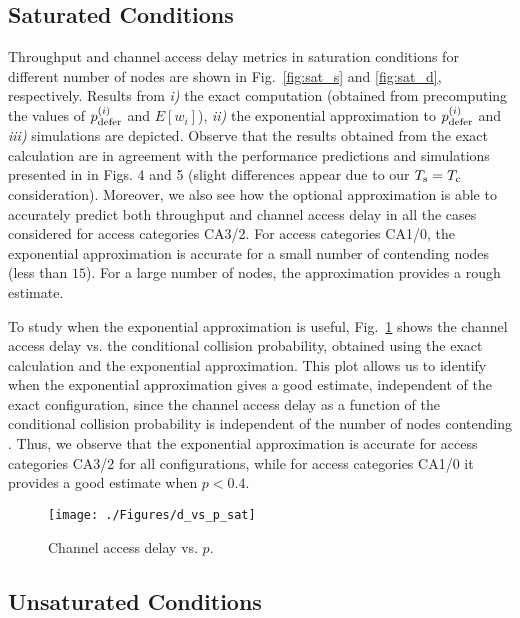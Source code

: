 \documentclass[preprint,12pt]{elsarticle}
\begin{document}
\subsection{Saturated Conditions}

Throughput and channel access delay metrics in saturation conditions for different number of nodes are shown in Fig.~\ref{fig:sat_s} and \ref{fig:sat_d}, respectively. Results from \emph{i)} the exact computation (obtained from precomputing the values of $p_{\rm defer}^{(i)}$ and $E[w_i]$), \emph{ii)} the exponential approximation to $p_{\rm defer}^{(i)}$ and \emph{iii)} simulations are depicted. Observe that the results obtained from the exact calculation are in agreement with the performance predictions and simulations presented in \cite{chung2006performance} in Figs. 4 and 5 (slight differences appear due to our $T_{\rm s} = T_{\rm c}$ consideration). Moreover, we also see how the optional approximation is able to accurately predict both throughput and channel access delay in all the cases considered for access categories CA3/2. For access categories CA1/0, the exponential approximation is accurate for a small number of contending nodes (less than $15$). For a large number of nodes, the approximation 
provides a rough estimate. 

To study when the exponential approximation is useful, Fig.~\ref{fig:sat_d_vs_p} shows the channel access delay vs. the conditional collision probability, obtained using the exact calculation and the exponential approximation. This plot allows us to identify when the exponential approximation gives a good estimate, independent of the exact configuration, since the channel access delay as a function of the conditional collision probability is independent of the number of nodes contending \cite{malone2007modeling}. Thus, we observe that the exponential approximation is accurate for access categories CA3/2 for all configurations, while for access categories CA1/0 it provides a good estimate when $p<0.4$.

\begin{figure}[!tb]
\centering
\texttt{[image: ./Figures/d\_vs\_p\_sat]}
\caption{Channel access delay vs. $p$.}
\label{fig:sat_d_vs_p}
\end{figure}

\subsection{Unsaturated Conditions}
\end{document}
